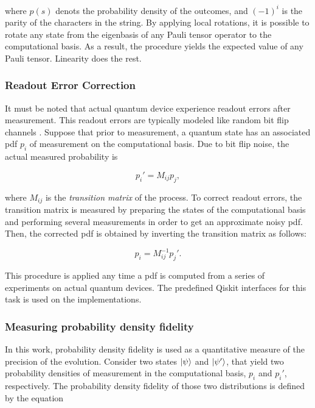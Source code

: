     \noindent where $p(s)$ denots the probability density of the outcomes, and $(-1)^{i}$ is the parity of the characters in the string. By applying local rotations, it is possible to rotate any state from the eigenbasis of any Pauli tensor operator to the computational basis. As a result, the procedure yields the expected value of any Pauli tensor. Linearity does the rest.

    \subsubsection{Readout Error Correction}
    \label{subsubsec:readoutErrorCorrection}

      It must be noted that actual quantum device experience readout errors after measurement. This readout errors are typically modeled like random bit flip channels \cite{Nielsen, Strini}. Suppose that prior to measurement, a quantum state has an associated pdf $p_i$ of measurement on the computational basis. Due to bit flip noise, the actual measured probability is

      \begin{equation}
        p_i' = M_{ij} p_j,
        \label{eq:MarkovMatrix}
      \end{equation}

      \noindent where $M_{ij}$ is the \textit{transition matrix} of the process. To correct readout errors, the transition matrix is measured by preparing the states of the computational basis and performing several measurements in order to get an approximate noisy pdf. Then, the corrected pdf is obtained by inverting the transition matrix as follows:

      \begin{equation}
        p_i = M_{ij}^{-1} p_j'.
        \label{eq:MarkovMatrix}
      \end{equation}

      This procedure is applied any time a pdf is computed from a series of experiments on actual quantum devices. The predefined Qiskit interfaces for this task is used on the implementations.

    \subsubsection{Measuring probability density fidelity}
    \label{subsubsec:PdfFidelityMeasurement}

      In this work, probability density fidelity is used as a quantitative measure of the precision of the evolution. Consider two states $\ket{\psi}$ and $\ket{\psi'}$, that yield two probability densities of measurement in the computational basis, $p_i$ and $p_i'$, respectively. The probability density fidelity of those two distributions is defined \cite{HubbardSimulLasHeras} by the equation

